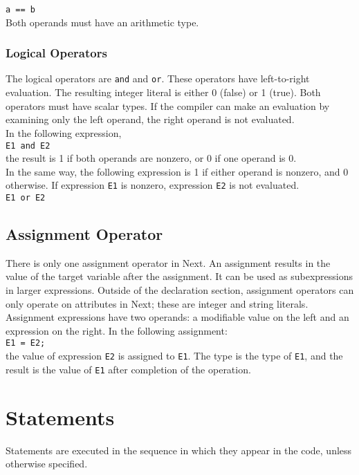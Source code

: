 \documentclass[12pt]{article}
\begin{document}
\texttt{a == b} \\

\noindent  Both operands must have an arithmetic type.

\subsubsection{Logical Operators}
The logical operators are \texttt{and} and \texttt{or}.  These operators have left-to-right evaluation.  The resulting integer literal is either 0 (false) or 1 (true).  Both operators must have scalar types.  If the compiler can make an evaluation by examining only the left operand, the right operand is not evaluated. \\

\noindent In the following expression, \\

\texttt{E1 and E2} \\

\noindent the result is 1 if both operands are nonzero, or 0 if one operand is 0.\\

\noindent In the same way, the following expression is 1 if either operand is nonzero, and 0 otherwise.  If expression \texttt{E1} is nonzero, expression \texttt{E2} is not evaluated. \\

\texttt{E1 or E2}

\subsection{Assignment Operator}
There is only one assignment operator in Next.  An assignment results in the value of the target variable after the assignment.  It can be used as subexpressions in larger expressions.  Outside of the declaration section, assignment operators can only operate on attributes in Next; these are integer and string literals.  Assignment expressions have two operands: a modifiable value on the left and an expression on the right.  In the following assignment: \\

\texttt{E1 = E2;} \\

\noindent the value of expression \texttt{E2} is assigned to \texttt{E1}.  The type is the type of \texttt{E1}, and the result is the value of \texttt{E1} after completion of the operation.

\section{Statements}
Statements are executed in the sequence in which they appear in the code, unless otherwise specified.
\end{document}

